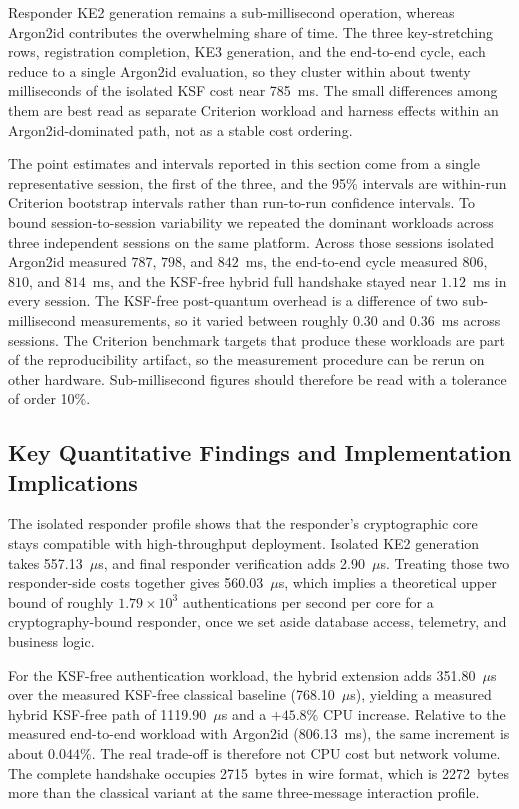 \documentclass{ieeeijc}
\theoremstyle{remark}
\begin{document}
Responder KE2 generation remains a sub-millisecond operation, whereas Argon2id
contributes the overwhelming share of time. The three key-stretching rows,
registration completion, KE3 generation, and the end-to-end cycle, each reduce to
a single Argon2id evaluation, so they cluster within about twenty milliseconds of
the isolated KSF cost near 785~ms. The small differences among them are best read
as separate Criterion workload and harness effects within an Argon2id-dominated
path, not as a stable cost ordering.

The point estimates and intervals reported in this section come from a single
representative session, the first of the three, and the 95\% intervals are
within-run Criterion bootstrap intervals rather than run-to-run confidence
intervals. To bound session-to-session variability we repeated the dominant
workloads across three independent sessions on the same platform. Across those
sessions isolated Argon2id measured $787$, $798$, and $842$~ms, the end-to-end
cycle measured $806$, $810$, and $814$~ms, and the KSF-free hybrid full handshake
stayed near $1.12$~ms in every session. The KSF-free post-quantum overhead is a
difference of two sub-millisecond measurements, so it varied between roughly
$0.30$ and $0.36$~ms across sessions. The Criterion benchmark targets that
produce these workloads are part of the reproducibility artifact, so the
measurement procedure can be rerun on other hardware. Sub-millisecond figures should therefore be
read with a tolerance of order 10\%.

\subsection{Key Quantitative Findings and Implementation Implications}

The isolated responder profile shows that the responder's cryptographic
core stays compatible with high-throughput deployment. Isolated KE2
generation takes 557.13~$\mu$s, and final responder verification adds
2.90~$\mu$s. Treating those two responder-side costs together gives
560.03~$\mu$s, which implies a theoretical upper bound of roughly
$1.79 \times 10^3$ authentications per second per core for a
cryptography-bound responder, once we set aside database access, telemetry,
and business logic.

For the KSF-free authentication workload, the hybrid extension adds
351.80~$\mu$s over the measured KSF-free classical baseline
(768.10~$\mu$s), yielding a measured hybrid KSF-free path of
1119.90~$\mu$s and a $+45.8\%$ CPU increase. Relative to the measured
end-to-end workload with Argon2id (806.13~ms), the same increment is about
$0.044\%$. The real trade-off is therefore not CPU cost but network volume.
The complete handshake occupies
2715~bytes in wire format, which is 2272~bytes more than the classical
variant at the same three-message interaction profile.
\end{document}
